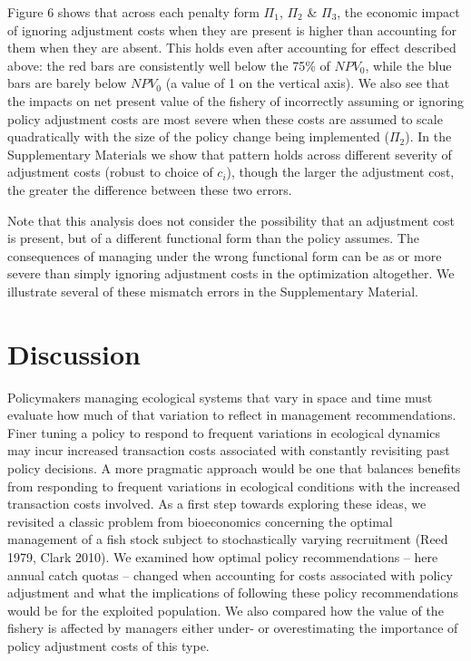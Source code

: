 \documentclass[review,12pt,author-year,titlepage]{components/elsarticle} %
\begin{document}
\begin{flushleft}
Figure 6 shows that across each penalty form \(\Pi_1\), \(\Pi_2\) \&
\(\Pi_3\), the economic impact of ignoring adjustment costs when they
are present is higher than accounting for them when they are absent.
This holds even after accounting for effect described above: the red
bars are consistently well below the 75\% of \(NPV_0\), while the blue
bars are barely below \(NPV_0\) (a value of 1 on the vertical axis). We
also see that the impacts on net present value of the fishery of
incorrectly assuming or ignoring policy adjustment costs are most severe
when these costs are assumed to scale quadratically with the size of the
policy change being implemented (\(\Pi_2\)). In the Supplementary
Materials we show that pattern holds across different severity of
adjustment costs (robust to choice of \(c_i\)), though the larger the
adjustment cost, the greater the difference between these two errors.

Note that this analysis does not consider the possibility that an
adjustment cost is present, but of a different functional form than the
policy assumes. The consequences of managing under the wrong functional
form can be as or more severe than simply ignoring adjustment costs in
the optimization altogether. We illustrate several of these mismatch
errors in the Supplementary Material.

\section{Discussion}\label{discussion}

Policymakers managing ecological systems that vary in space and time
must evaluate how much of that variation to reflect in management
recommendations. Finer tuning a policy to respond to frequent variations
in ecological dynamics may incur increased transaction costs associated
with constantly revisiting past policy decisions. A more pragmatic
approach would be one that balances benefits from responding to frequent
variations in ecological conditions with the increased transaction costs
involved. As a first step towards exploring these ideas, we revisited a
classic problem from bioeconomics concerning the optimal management of a
fish stock subject to stochastically varying recruitment (Reed 1979,
Clark 2010). We examined how optimal policy recommendations -- here
annual catch quotas -- changed when accounting for costs associated with
policy adjustment and what the implications of following these policy
recommendations would be for the exploited population. We also compared
how the value of the fishery is affected by managers either under- or
overestimating the importance of policy adjustment costs of this type.


\end{flushleft}
\end{document}
